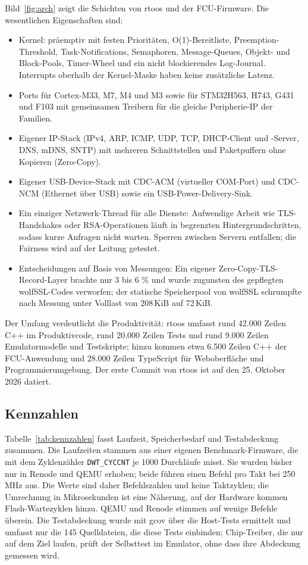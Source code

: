 \documentclass[]{article}
\begin{document}
Bild~\ref{fig:arch} zeigt die Schichten von rtoos und der FCU-Firmware. Die wesentlichen Eigenschaften sind:
\begin{itemize}
\item Kernel: präemptiv mit festen Prioritäten, O(1)-Bereitliste, Preemption-Threshold, Task-Notifications, Semaphoren, Message-Queues, Objekt- und Block-Pools, Timer-Wheel und ein nicht blockierendes Log-Journal. Interrupts oberhalb der Kernel-Maske haben keine zusätzliche Latenz.
\item Ports für Cortex-M33, M7, M4 und M3 sowie für STM32H563, H743, G431 und F103 mit gemeinsamen Treibern für die gleiche Peripherie-IP der Familien.
\item Eigener IP-Stack (IPv4, ARP, ICMP, UDP, TCP, DHCP-Client und -Server, DNS, mDNS, SNTP) mit mehreren Schnittstellen und Paketpuffern ohne Kopieren (Zero-Copy).
\item Eigener USB-Device-Stack mit CDC-ACM (virtueller COM-Port) und CDC-NCM (Ethernet über USB) sowie ein USB-Power-Delivery-Sink.
\item Ein einziger Netzwerk-Thread für alle Dienste: Aufwendige Arbeit wie TLS-Handshakes oder RSA-Operationen läuft in begrenzten Hintergrundschritten, sodass kurze Anfragen nicht warten. Sperren zwischen Servern entfallen; die Fairness wird auf der Leitung getestet.
\item Entscheidungen auf Basis von Messungen: Ein eigener Zero-Copy-TLS-Record-Layer brachte nur 3 bis 6 \% und wurde zugunsten des gepflegten wolfSSL-Codes verworfen; der statische Speicherpool von wolfSSL schrumpfte nach Messung unter Volllast von 208\,KiB auf 72\,KiB.
\end{itemize}

Der Umfang verdeutlicht die Produktivität: rtoos umfasst rund 42.000 Zeilen C++ im Produktivcode, rund 20.000 Zeilen Tests und rund 9.000 Zeilen Emulatormodelle und Testskripte; hinzu kommen etwa 6.500 Zeilen C++ der FCU-Anwendung und 28.000 Zeilen TypeScript für Weboberfläche und Programmierumgebung. Der erste Commit von rtoos ist auf den 25. Oktober 2026 datiert.

\subsection{Kennzahlen}

Tabelle~\ref{tab:kennzahlen} fasst Laufzeit, Speicherbedarf und Testabdeckung zusammen. Die Laufzeiten stammen aus einer eigenen Benchmark-Firmware, die mit dem Zyklenzähler \texttt{DWT\_CYCCNT} je 1000 Durchläufe misst. Sie wurden bisher nur in Renode und QEMU erhoben; beide führen einen Befehl pro Takt bei 250\,MHz aus. Die Werte sind daher Befehlszahlen und keine Taktzyklen; die Umrechnung in Mikrosekunden ist eine Näherung, auf der Hardware kommen Flash-Wartezyklen hinzu. QEMU und Renode stimmen auf wenige Befehle überein. Die Testabdeckung wurde mit gcov über die Host-Tests ermittelt und umfasst nur die 145 Quelldateien, die diese Tests einbinden; Chip-Treiber, die nur auf dem Ziel laufen, prüft der Selbsttest im Emulator, ohne dass ihre Abdeckung gemessen wird.
\end{document}
